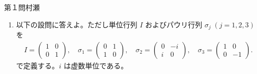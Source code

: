 \begin{question}{第１問}{村瀬}
\begin{enumerate}
\item
  以下の設問に答えよ。ただし単位行列 $I$ およびパウリ行列 $\sigma_j\;(j=1, 2, 3)$ を
  \begin{align*}
    I=\begin{pmatrix} 1&0 \\ 0 & 1 \end{pmatrix},\quad
    \sigma_1=\begin{pmatrix} 0&1 \\ 1&0 \end{pmatrix},\quad
    \sigma_2=\begin{pmatrix} 0&-i \\ i&0 \end{pmatrix},\quad
    \sigma_3=\begin{pmatrix} 1&0 \\ 0&-1 \end{pmatrix}.
  \end{align*}
  で定義する。$i$ は虚数単位である。


\end{enumerate}
\end{question}
